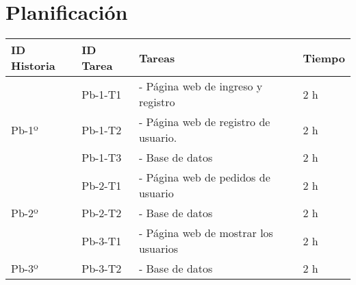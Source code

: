 \chapter{Planificación}

\begin{table}[htbp]
	\begin{center}
		\begin{tabular}{| p{2.0cm}|p{2.0cm} | p{5.5 cm} | p{3.0cm}| }
			\hline
			\centering\textbf{ID Historia} & \textbf{ID Tarea}& \textbf{Tareas} & \textbf{Tiempo}
			
			\\\hline
			
			 & \centering Pb-1-T1 & - Página web de ingreso y registro & 2 h
			\\
			\centering Pb-1º & \centering Pb-1-T2 & - Página web de registro de usuario. & 2 h
			\\
			& \centering Pb-1-T3 & - Base de datos & 2 h
			
			\\\hline
			 & \centering Pb-2-T1 & - Página web de pedidos de usuario & 2 h
			\\
			\centering Pb-2º
			& \centering Pb-2-T2 & - Base de datos & 2 h
			
			\\\hline
			& \centering Pb-3-T1 & - Página web de mostrar los usuarios & 2 h
			\\
			\centering Pb-3º
			& \centering Pb-3-T2 & - Base de datos & 2 h
			
			\\\hline
		\end{tabular}
	\end{center}
\end{table}